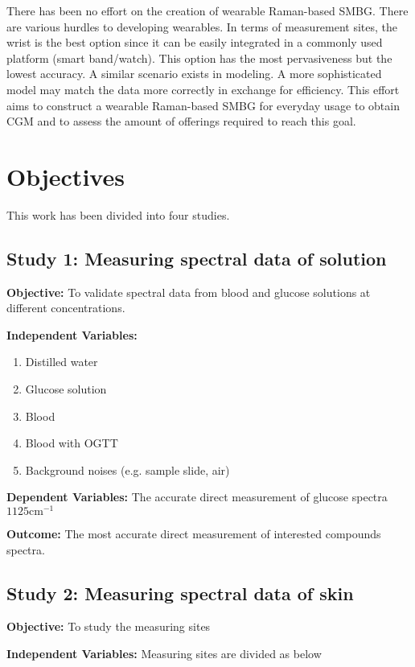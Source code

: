 There has been no effort on the creation of wearable Raman-based SMBG. 
There are various hurdles to developing wearables. In terms of measurement sites, the wrist is the best option since it can be easily integrated in a commonly used platform (smart band/watch). 
This option has the most pervasiveness but the lowest accuracy. 
A similar scenario exists in modeling. 
A more sophisticated model may match the data more correctly in exchange for efficiency. 
This effort aims to construct a wearable Raman-based SMBG for everyday usage to obtain CGM and to assess the amount of offerings required to reach this goal.


\section{Objectives}

This work has been divided into four studies. 

\subsection{Study 1: Measuring spectral data of solution}

\textbf{Objective:} To validate spectral data from blood and glucose solutions at different concentrations.

\textbf{Independent Variables:}

\begin{enumerate}
    \item Distilled water
    \item Glucose solution
    \item Blood 
    \item Blood with OGTT
    \item Background noises (e.g. sample slide, air)
\end{enumerate}

\textbf{Dependent Variables:} The accurate direct measurement of glucose spectra \( 1125 \text{cm}^{-1} \)


\textbf{Outcome:} The most accurate direct measurement of interested compounds spectra.

\subsection{Study 2: Measuring spectral data of skin}

\textbf{Objective:} To study the measuring sites


\textbf{Independent Variables:} Measuring sites are divided as below


